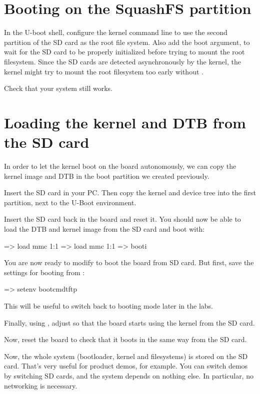\section{Booting on the SquashFS partition}

In the U-boot shell, configure the kernel command line to use the
second partition of the SD card as the root file system. Also add the
 boot argument, to wait for the SD card to be properly
initialized before trying to mount the root filesystem. Since the SD
cards are detected asynchronously by the kernel, the kernel might try
to mount the root filesystem too early without .

Check that your system still works.

\section{Loading the kernel and DTB from the SD card}

In order to let the kernel boot on the board autonomously, we can
copy the kernel image and DTB in the boot partition we created
previously.

Insert the SD card in your PC. Then copy the kernel and device tree into the
first partition, next to the U-Boot environment.

Insert the SD card back in the board and reset it. You should now be
able to load the DTB and kernel image from the SD card and boot with:

\begin{ubootinput}
=> load mmc 1:1 %
=> load mmc 1:1 %
=> booti %
\end{ubootinput}

You are now ready to modify  to boot the board
from SD card. But first, save the settings for booting from
:

\begin{ubootinput}
=> setenv bootcmdtftp %
\end{ubootinput}

This will be useful to switch back to  booting mode
later in the labs.

Finally, using , adjust  so that
the board starts using the kernel from the SD card.

Now, reset the board to check that it boots in the same way from the
SD card.

Now, the whole system (bootloader, kernel and filesystems) is
stored on the SD card. That's very useful for product demos, for
example. You can switch demos by switching SD cards, and the
system depends on nothing else. In particular, no networking is
necessary.
